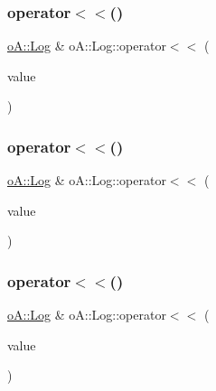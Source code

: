 \subsubsection{\texorpdfstring{operator$<$$<$()}{operator<<()}\hspace{0.1cm}{\footnotesize\ttfamily [5/9]}}
{\footnotesize\ttfamily \mbox{\hyperlink{classo_a_1_1_log}{o\+A\+::\+Log}} \& o\+A\+::\+Log\+::operator$<$$<$ (\begin{DoxyParamCaption}\item[{bool}]{value }\end{DoxyParamCaption})}

\mbox{\label{classo_a_1_1_log_a206fea477101843b2eb9cbc71ebd34cd}} 
\subsubsection{\texorpdfstring{operator$<$$<$()}{operator<<()}\hspace{0.1cm}{\footnotesize\ttfamily [6/9]}}
{\footnotesize\ttfamily \mbox{\hyperlink{classo_a_1_1_log}{o\+A\+::\+Log}} \& o\+A\+::\+Log\+::operator$<$$<$ (\begin{DoxyParamCaption}\item[{\mbox{\hyperlink{namespaceo_a_ab34d92c907da3ac86211277a1341c6c2}{o\+A\+::\+Long}}}]{value }\end{DoxyParamCaption})}

\mbox{\label{classo_a_1_1_log_a59165364886174ee41ef0addd123b216}} 
\subsubsection{\texorpdfstring{operator$<$$<$()}{operator<<()}\hspace{0.1cm}{\footnotesize\ttfamily [7/9]}}
{\footnotesize\ttfamily \mbox{\hyperlink{classo_a_1_1_log}{o\+A\+::\+Log}} \& o\+A\+::\+Log\+::operator$<$$<$ (\begin{DoxyParamCaption}\item[{\mbox{\hyperlink{namespaceo_a_a2bcc976232176d2dcf8b9df1fa33c038}{o\+A\+::\+Double}}}]{value }\end{DoxyParamCaption})}

